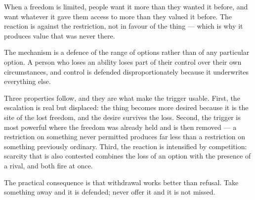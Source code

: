 


\begin{core}
When a freedom is limited, people want it more than they wanted it before, and want whatever it gave them access to more than they valued it before. The reaction is against the restriction, not in favour of the thing --- which is why it produces value that was never there.
\end{core}

\begin{mechanism}
The mechanism is a defence of the range of options rather than of any particular option. A person who loses an ability loses part of their control over their own circumstances, and control is defended disproportionately because it underwrites everything else.

Three properties follow, and they are what make the trigger usable. First, the escalation is real but displaced: the thing becomes more desired because it is the site of the lost freedom, and the desire survives the loss. Second, the trigger is most powerful where the freedom was already held and is then removed --- a restriction on something never permitted produces far less than a restriction on something previously ordinary. Third, the reaction is intensified by competition: scarcity that is also contested combines the loss of an option with the presence of a rival, and both fire at once.

The practical consequence is that withdrawal works better than refusal. Take something away and it is defended; never offer it and it is not missed.
\end{mechanism}

